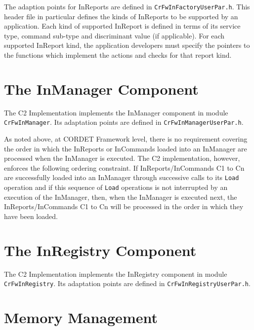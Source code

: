 \documentclass{pnp_article}
\begin{document}
The adaption points for InReports are defined in \texttt{CrFwInFactoryUserPar.h}. This header file in particular defines the kinds of InReports to be supported by an application. Each kind of supported InReport is defined in terms of its service type, command sub-type and discriminant value (if applicable). For each supported InReport kind, the application developers must specify the pointers to the functions which implement the actions and checks for that report kind.


\section{The InManager Component}\label{sec:InManager}


The C2 Implementation implements the InManager component in module \texttt{CrFwInManager}. Its adaptation points are defined in \texttt{CrFwInManagerUserPar.h}.

As noted above, at CORDET Framework level, there is no requirement covering the order in which the InReports or InCommands loaded into an InManager are processed when the InManager is executed. The C2 implementation, however, enforces the following ordering constraint. If InReports/InCommands C1 to Cn are successfully loaded into an InManager through successive calls to its \texttt{Load} operation and if this sequence of \texttt{Load} operations is not interrupted by an execution of the InManager, then, when the InManager is executed next, the InReports/InCommands C1 to Cn will be processed in the order in which they have been loaded.


\section{The InRegistry Component}\label{sec:InRegistry}


The C2 Implementation implements the InRegistry component in module \texttt{CrFwInRegistry}. Its adaptation points are defined in \texttt{CrFwInRegistryUserPar.h}.


\section{Memory Management}\label{sec:MemMng}
\end{document}

